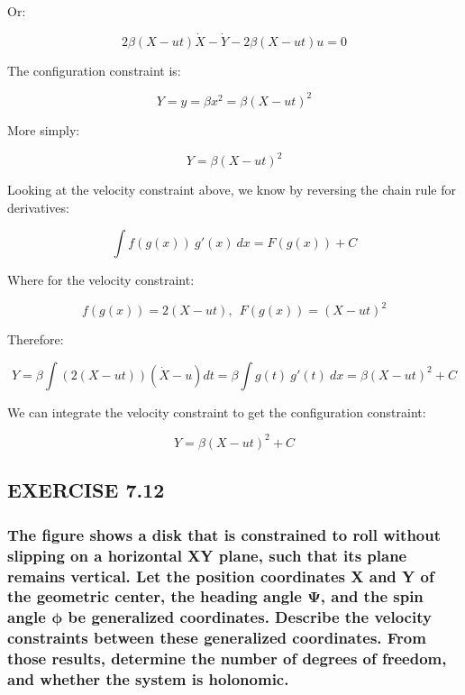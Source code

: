 \documentclass[12pt, letterpaper]{../assignment}
\begin{document}
Or:

\begin{answer}
$$  2 \beta \left( X - ut \right)\dot{X}- \dot{Y} - 2 \beta \left( X - ut \right)u = 0  $$
\end{answer}

The configuration constraint is:

$$ Y = y = \beta x^2 = \beta \left( X - ut \right)^2 $$

More simply:

\begin{answer}
$$ Y =  \beta \left( X - ut \right)^2 $$
\end{answer}

Looking at the velocity constraint above, we know by reversing the chain rule for derivatives:

$$ \int f(g(x))\ g'(x)\ dx = F(g(x)) + C $$

Where for the velocity constraint:

$$ f(g(x)) = 2 \left( X - ut \right), \ \ F(g(x)) = \left( X - ut \right)^2 $$

Therefore:

$$ Y = \beta \int \left(2 \left( X - ut \right)\right) \left( \dot{X} - u \right) dt = 
\beta \int g(t)\ g'(t)\ dx = \beta \left( X - ut \right)^2  + C $$

We can integrate the velocity constraint to get the configuration constraint:

\begin{answer}
    $$ Y =  \beta \left( X - ut \right)^2 + C $$
\end{answer}


\subsection*{EXERCISE 7.12}
\subsubsection*{The figure shows a disk that is constrained to roll
without slipping on a horizontal XY plane,
such that its plane remains vertical.
Let the position coordinates X and Y of the geometric center,
the heading angle $\bm{\Psi}$,
and the spin angle $\bm{\phi}$ be generalized coordinates.
Describe the velocity constraints between these generalized coordinates.
From those results, determine the number of degrees of freedom,
and whether the system is holonomic.}
\end{document}
